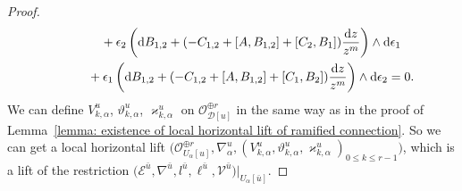 \documentclass[pdftex]{sigma}
\numberwithin{equation}{section}
\begin{document}
\begin{proof}
\begin{gather*}
 \qquad\quad{}
 +
 \epsilon_2
 \left( {\rm d}B_{1,2}+(-C_{1,2}+[A,B_{1,2}]+[C_2,B_1])\frac{{\rm d}z} {z^m}
 \right) \wedge {\rm d}\epsilon_1
 \\
 \qquad \quad{}
 +
 \epsilon_1
 \left( {\rm d}B_{1,2}+(-C_{1,2}+[A,B_{1,2}]+[C_1,B_2])\frac{{\rm d}z} {z^m}
 \right) \wedge {\rm d}\epsilon_2
 =0.
\end{gather*}
We can define
$V^u_{k,\alpha}$, $\vartheta^u_{k,\alpha}$, $\varkappa^u_{k,\alpha}$
on ${\mathcal O}_{{\mathcal D}[u]}^{\oplus r}$
in the same way as in the proof of
Lemma~\ref{lemma: existence of local horizontal lift of ramified connection}.
So we can get a local horizontal lift
$\big(
{\mathcal O}_{U_{\alpha}[u]}^{\oplus r},\nabla^u_{\alpha},
(V^u_{k,\alpha},\vartheta^u_{k,\alpha},\varkappa^u_{k,\alpha})_{0\leq k\leq r-1} \big)$,
which is a lift of the restriction
$\big({\mathcal E}^{\bar{u}},\nabla^{\bar{u}},l^{\bar{u}},\ell^{\bar{u}},{\mathcal V}^{\bar{u}}\big)
|_{U_{\alpha}[\bar{u}]}$.


\end{proof}
\end{document}
